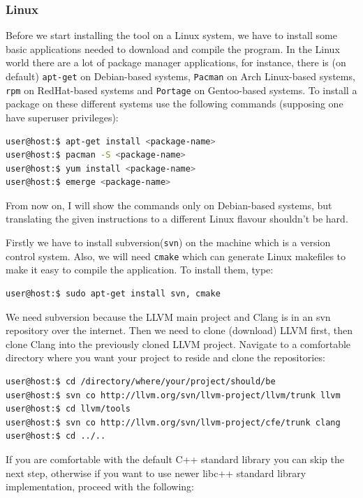 \subsubsection{Linux}\label{linux}
\par Before we start installing the tool on a Linux system, we have to install some basic applications needed to download and compile the program. In the Linux world there are a lot of package manager applications, for instance, there is (on default) \verb|apt-get| on Debian-based systems, \verb|Pacman| on Arch Linux-based systems, \verb|rpm| on RedHat-based systems and \verb|Portage| on Gentoo-based systems. To install a package on these different systems use the following commands (supposing one have superuser privileges):
\begin{lstlisting}[language=bash, frame=single]
user@host:$ apt-get install <package-name>
user@host:$ pacman -S <package-name>
user@host:$ yum install <package-name>
user@host:$ emerge <package-name>
\end{lstlisting}
\par From now on, I will show the commands only on Debian-based systems, but translating the given instructions to a different Linux flavour shouldn't be hard. \medskip
\par Firstly we have to install subversion(\verb|svn|) on the machine which is a version control system. Also, we will need \verb|cmake| which can generate Linux makefiles to make it easy to compile the application. To install them, type:
\begin{lstlisting}[language=bash, frame=single]
user@host:$ sudo apt-get install svn, cmake
\end{lstlisting}
\par We need subversion because the LLVM main project and Clang is in an svn repository over the internet. Then we need to clone (download) LLVM first, then clone Clang into the previously cloned LLVM project. Navigate to a comfortable directory where you want your project to reside and clone the repositories:
\begin{lstlisting}[language=bash, frame=single]
user@host:$ cd /directory/where/your/project/should/be
user@host:$ svn co http://llvm.org/svn/llvm-project/llvm/trunk llvm
user@host:$ cd llvm/tools
user@host:$ svn co http://llvm.org/svn/llvm-project/cfe/trunk clang
user@host:$ cd ../..
\end{lstlisting}
\par If you are comfortable with the default C++ standard library you can skip the next step, otherwise if you want to use newer libc++ standard library implementation, proceed with the following:
